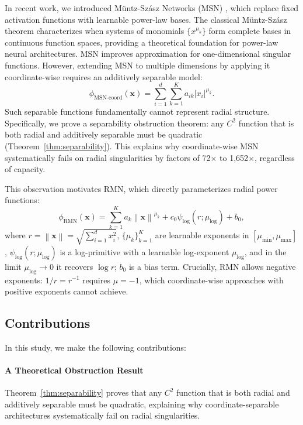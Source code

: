 \documentclass[twoside,11pt]{article}
\newcommand{\bx}{\bm{x}}
\newcommand{\norm}[1]{\left\|#1\right\|}
\begin{document}
In recent work, we introduced M\"untz-Sz\'asz Networks (MSN) \citep{nguessan2025msn}, which replace fixed activation functions with learnable power-law bases. The classical M\"untz-Sz\'asz theorem \citep{muntz1914, szasz1916} characterizes when systems of monomials $\{x^{\mu_k}\}$ form complete bases in continuous function spaces, providing a theoretical foundation for power-law neural architectures. MSN improves approximation for one-dimensional singular functions. However, extending MSN to multiple dimensions by applying it coordinate-wise requires an additively separable model:
\begin{equation}
	\phi_{\text{MSN-coord}}(\bx) = \sum_{i=1}^{d} \sum_{k=1}^{K} a_{ik} |x_i|^{\mu_k}.
\end{equation}
Such separable functions fundamentally cannot represent radial structure. Specifically, we prove a separability obstruction theorem: any $C^2$ function that is both radial and additively separable must be quadratic (Theorem~\ref{thm:separability}). This explains why coordinate-wise MSN systematically fails on radial singularities by factors of 72$\times$ to 1,652$\times$, regardless of capacity.

This observation motivates RMN, which directly parameterizes radial power functions:
\begin{equation}
	\phi_{\text{RMN}}(\bx) = \sum_{k=1}^{K} a_k \norm{\bx}^{\mu_k} + c_0 \psi_{\log}(r;\mu_{\log}) + b_0,
\end{equation}
where $r = \norm{\bx} = \sqrt{\sum_{i=1}^d x_i^2}$, $\{\mu_k\}_{k=1}^K$ are learnable exponents in $[\mu_{\min}, \mu_{\max}]$, $\psi_{\log}(r;\mu_{\log})$ is a log-primitive with a learnable log-exponent $\mu_{\log}$, and in the limit $\mu_{\log}\to 0$ it recovers $\log r$; $b_0$ is a bias term. Crucially, RMN allows negative exponents: $1/r = r^{-1}$ requires $\mu = -1$, which coordinate-wise approaches with positive exponents cannot achieve.

\subsection{Contributions}
In this study, we make the following contributions:

\paragraph{A Theoretical Obstruction Result} Theorem~\ref{thm:separability} proves that any $C^2$ function that is both radial and additively separable must be quadratic, explaining why coordinate-separable architectures systematically fail on radial singularities.
\end{document}
